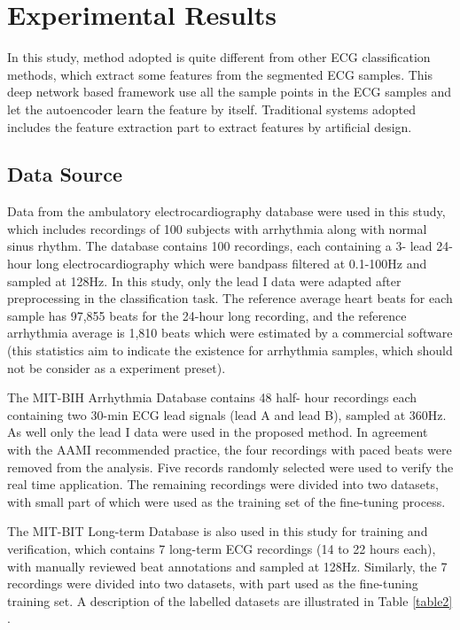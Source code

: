 \documentclass[journal]{IEEEtran}
\begin{document}
\section{Experimental Results}

In this study, method adopted is quite different from other ECG classification methods, which extract some features from the segmented ECG samples. This deep network based framework use all the sample points in the ECG samples and let the autoencoder learn the feature by itself.  Traditional systems adopted includes the feature extraction part to extract features by artificial design.

\subsection{Data Source}
Data from the ambulatory electrocardiography database were used in this study, which includes recordings of 100 subjects with arrhythmia along with normal sinus rhythm. The database contains 100 recordings, each containing a 3- lead 24-hour long electrocardiography which were bandpass filtered at 0.1-100Hz and sampled at 128Hz. In this study, only the lead I data were adapted after preprocessing in the classification task. The reference average heart beats for each sample has 97,855 beats for the 24-hour long recording, and the reference arrhythmia average is 1,810 beats which were estimated by a commercial software (this statistics aim to indicate the existence for arrhythmia samples, which should not be consider as a experiment preset).

The MIT-BIH Arrhythmia Database \cite{physionet} contains 48 half- hour recordings each containing two 30-min ECG lead signals (lead A and lead B), sampled at 360Hz. As well only the lead I data were used in the proposed method. In agreement with the AAMI recommended practice, the four recordings with paced beats were removed from the analysis. Five records randomly selected were used to verify the real time application. The remaining recordings were divided into two datasets, with small part of which were used as the training set of the fine-tuning process.

The MIT-BIT Long-term Database is also used in this study for training and verification, which contains 7 long-term ECG recordings (14 to 22 hours each), with manually reviewed beat annotations and sampled at 128Hz. Similarly, the 7 recordings were divided into two datasets, with part used as the fine-tuning training set. A description of the labelled datasets are illustrated in Table  \ref{table2} .
\end{document}

